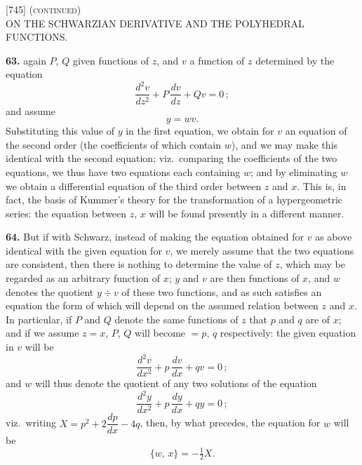 \documentclass[11pt,a4paper]{article}
\newcommand{\artno}[1]{\textbf{#1.}\quad}
\begin{document}

\begin{center}
\textsc{[745] (continued)}\\[2pt]
\textsc{ON THE SCHWARZIAN DERIVATIVE AND THE POLYHEDRAL FUNCTIONS.}
\end{center}

\bigskip

\noindent
\artno{63} again $P$, $Q$ given functions of $z$, and $v$ a function of $z$
determined by the equation
\[
  \frac{d^2 v}{dz^2} + P\,\frac{dv}{dz} + Qv = 0\,;
\]
and assume
\[
  y = wv.
\]
Substituting this value of $y$ in the first equation, we obtain for $v$ an
equation of the second order (the coefficients of which contain $w$), and we
may make this identical with the second equation; viz.\ comparing the
coefficients of the two equations, we thus have two equations each containing
$w$; and by eliminating $w$ we obtain a differential equation of the third
order between $z$ and $x$. This is, in fact, the basis of Kummer's theory for
the transformation of a hypergeometric series: the equation between $z$, $x$
will be found presently in a different manner.

\artno{64} But if with Schwarz, instead of making the equation obtained for
$v$ as above identical with the given equation for $v$, we merely assume that
the two equations are consistent, then there is nothing to determine the
value of $z$, which may be regarded as an arbitrary function of $x$; $y$ and
$v$ are then functions of $x$, and $w$ denotes the quotient $y\div v$ of these
two functions, and as such satisfies an equation the form of which will
depend on the assumed relation between $z$ and $x$. In particular, if $P$ and
$Q$ denote the same functions of $z$ that $p$ and $q$ are of $x$; and if we
assume $z=x$, $P$, $Q$ will become $=p$, $q$ respectively: the given equation
in $v$ will be
\[
  \frac{d^2 v}{dx^2} + p\,\frac{dv}{dx} + qv = 0\,;
\]
and $w$ will thus denote the quotient of any two solutions of the equation
\[
  \frac{d^2 y}{dx^2} + p\,\frac{dy}{dx} + qy = 0\,;
\]
viz.\ writing $X = p^2 + 2\dfrac{dp}{dx} - 4q$, then, by what precedes, the
equation for $w$ will be
\[
  \{w,\,x\} = -\tfrac{1}{2}X.
\]
\end{document}
